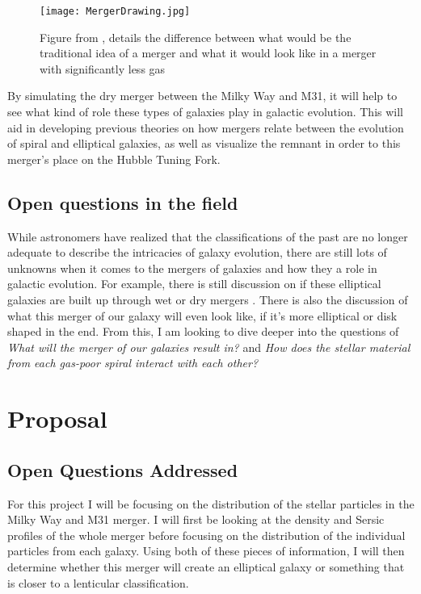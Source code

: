 \documentclass[twocolumn]{aastex63}
\begin{document}
\begin{figure}[h]
    \centering
    \texttt{[image: MergerDrawing.jpg]}
    \caption{Figure from \cite{2011ApJ...736...84M}, details the difference between what would be the traditional idea of a merger and what it would look like in a merger with significantly less gas}
    \label{fig:my_label}
\end{figure}

By simulating the dry merger between the Milky Way and M31, it will help to see what kind of role these types of galaxies play in galactic evolution. This will aid in developing previous theories on how mergers relate between the evolution of spiral and elliptical galaxies, as well as visualize the remnant in order to this merger's place on the Hubble Tuning Fork. 

\subsection{Open questions in the field}
While astronomers have realized that the classifications of the past are no longer adequate to describe the intricacies of galaxy evolution, there are still lots of unknowns when it comes to the mergers of galaxies and how they a role in galactic evolution. For example, there is still discussion on if these elliptical galaxies are built up through wet or dry mergers \citep{2013ASPC..477...47D}. There is also the discussion of what this merger of our galaxy will even look like, if it's more elliptical or disk shaped in the end. From this, I am looking to dive deeper into the questions of \textit{What will the merger of our galaxies result in?} and \textit{How does the stellar material from each gas-poor spiral interact with each other?}

\section{Proposal}
\subsection{Open Questions Addressed}
For this project I will be focusing on the distribution of the stellar particles in the Milky Way and M31 merger. I will first be looking at the density and Sersic profiles of the whole merger before focusing on the distribution of the individual particles from each galaxy. Using both of these pieces of information, I will then determine whether this merger will create an elliptical galaxy or something that is closer to a lenticular classification.
\end{document}
